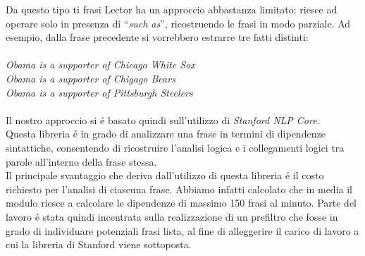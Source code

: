 \documentclass[twocolumn,10pt]{asme2ej}
\begin{document}
 Da questo tipo ti frasi Lector ha un approccio abbastanza limitato: riesce ad operare solo in presenza di ``\textit{such as}'', ricostruendo le frasi in modo parziale. Ad esempio, dalla frase precedente si vorrebbero estrarre tre fatti distinti:\\
 \textit{\\ 
 Obama is a supporter of Chicago White Sox\\
 Obama is a supporter of Chigago Bears\\ 
 Obama is a supporter of Pittsburgh Steelers}\\
 \\ Il nostro approccio si \'e basato  quindi sull'utilizzo di \textit{Stanford NLP Core}. \\Questa libreria \'e in grado di analizzare una frase in termini di dipendenze sintattiche, consentendo di ricostruire l'analisi logica e i collegamenti logici tra parole all'interno della frase stessa. \\Il principale svantaggio  che deriva  dall'utilizzo di questa  libreria \'e il costo richiesto per l'analisi di ciascuna frase. Abbiamo infatti calcolato che in media il modulo riesce a calcolare le dipendenze di massimo 150 frasi al minuto. Parte del lavoro \'e stata quindi incentrata sulla realizzazione di un prefiltro che fosse in grado di individuare potenziali frasi lista, al fine di alleggerire il carico di lavoro a cui la libreria di Stanford viene sottoposta. 
 
\end{document}
